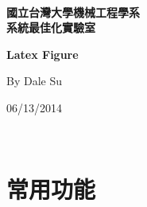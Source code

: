 \documentclass[12pt,a4paper]{report}
\begin{document}
\begin{CJK}{UTF8}{bkai}
\thispagestyle{empty}
\begin{center}
       ~\\
        \vspace{6.8cm}

        \textbf{\Huge
國立台灣大學機械工程學系 \\
系統最佳化實驗室
}
        \vspace{3cm}

        \textbf{\Huge
	Latex Figure
        }
        \vspace{6cm}

        {\large
        By  Dale Su
        }
        \vspace{4cm}

        {\large
            06/13/2014
        }
    \end{center}

\newpage

\tableofcontents
\listoffigures


\thispagestyle{empty}
~
\newpage

\chapter{常用功能}


\end{CJK}
\end{document}
